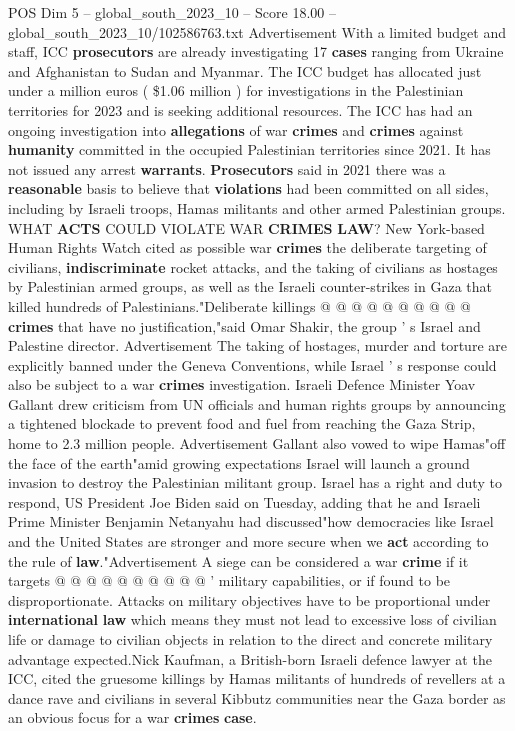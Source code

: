 \begin{textsample}{POS Dim 5 – global\_south\_2023\_10 – Score 18.00 – global\_south\_2023\_10/102586763.txt}
Advertisement With a limited budget and staff, ICC \textbf{prosecutors} are already investigating 17 \textbf{cases} ranging from Ukraine and Afghanistan to Sudan and Myanmar.
The ICC budget has allocated just under a million euros ( \$1.06 million ) for investigations in the Palestinian territories for 2023 and is seeking additional resources.
The ICC has had an ongoing investigation into \textbf{allegations} of war \textbf{crimes} and \textbf{crimes} against \textbf{humanity} committed in the occupied Palestinian territories since 2021.
It has not issued any arrest \textbf{warrants}. \textbf{Prosecutors} said in 2021 there was a \textbf{reasonable} basis to believe that \textbf{violations} had been committed on all sides, including by Israeli troops, Hamas militants and other armed Palestinian groups.
WHAT \textbf{ACTS} COULD VIOLATE WAR \textbf{CRIMES} \textbf{LAW}?
New York-based Human Rights Watch cited as possible war \textbf{crimes} the deliberate targeting of civilians, \textbf{indiscriminate} rocket attacks, and the taking of civilians as hostages by Palestinian armed groups, as well as the Israeli counter-strikes in Gaza that killed hundreds of Palestinians."Deliberate killings @ @ @ @ @ @ @ @ @ @ \textbf{crimes} that have no justification,"said Omar Shakir, the group ' s Israel and Palestine director.
Advertisement The taking of hostages, murder and torture are explicitly banned under the Geneva Conventions, while Israel ' s response could also be subject to a war \textbf{crimes} investigation.
Israeli Defence Minister Yoav Gallant drew criticism from UN officials and human rights groups by announcing a tightened blockade to prevent food and fuel from reaching the Gaza Strip, home to 2.3 million people.
Advertisement Gallant also vowed to wipe Hamas"off the face of the earth"amid growing expectations Israel will launch a ground invasion to destroy the Palestinian militant group.
Israel has a right and duty to respond, US President Joe Biden said on Tuesday, adding that he and Israeli Prime Minister Benjamin Netanyahu had discussed"how democracies like Israel and the United States are stronger and more secure when we \textbf{act} according to the rule of \textbf{law}."Advertisement A siege can be considered a war \textbf{crime} if it targets @ @ @ @ @ @ @ @ @ @ ' military capabilities, or if found to be disproportionate.
Attacks on military objectives have to be proportional under \textbf{international} \textbf{law} which means they must not lead to excessive loss of civilian life or damage to civilian objects in relation to the direct and concrete military advantage expected.Nick Kaufman, a British-born Israeli defence lawyer at the ICC, cited the gruesome killings by Hamas militants of hundreds of revellers at a dance rave and civilians in several Kibbutz communities near the Gaza border as an obvious focus for a war \textbf{crimes} \textbf{case}.

\end{textsample}
